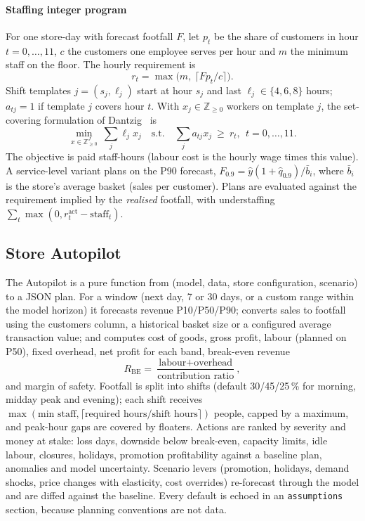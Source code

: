 \documentclass[conference]{IEEEtran}
\newcommand{\code}[1]{\texttt{\small #1}}
\begin{document}
\paragraph*{Staffing integer program} For one store-day with forecast footfall $F$, let $p_t$ be the
share of customers in hour $t=0,\dots,11$, $c$ the customers one employee serves per hour and $m$ the
minimum staff on the floor. The hourly requirement is
\begin{equation}
  r_t = \max\bigl(m,\ \lceil F p_t / c\rceil\bigr).
\end{equation}
Shift templates $j=(s_j,\ell_j)$ start at hour $s_j$ and last $\ell_j\in\{4,6,8\}$ hours; $a_{tj}=1$
if template $j$ covers hour $t$. With $x_j\in\mathbb{Z}_{\ge0}$ workers on template $j$, the
set-covering formulation of Dantzig~\cite{dantzig1954comment} is
\begin{equation}
  \min_{x\in\mathbb{Z}^{J}_{\ge 0}} \ \sum_j \ell_j x_j
  \quad\text{s.t.}\quad \sum_j a_{tj} x_j \ \ge\ r_t,\ \ t=0,\dots,11 .
\end{equation}
The objective is paid staff-hours (labour cost is the hourly wage times this value). A service-level
variant plans on the P90 forecast, $F_{0.9}=\hat y(1+\hat q_{0.9})/\bar b_i$, where $\bar b_i$ is the
store's average basket (sales per customer). Plans are evaluated against the requirement implied by
the \emph{realised} footfall, with understaffing $\sum_t \max(0, r^{\text{act}}_t - \text{staff}_t)$.

\subsection{Store Autopilot}\label{sec:autopilot}
The Autopilot is a pure function from (model, data, store configuration, scenario) to a JSON plan.
For a window (next day, 7 or 30 days, or a custom range within the model horizon) it forecasts
revenue P10/P50/P90; converts sales to footfall using the customers column, a historical basket size
or a configured average transaction value; and computes cost of goods, gross profit, labour (planned
on P50), fixed overhead, net profit for each band, break-even revenue
\begin{equation}
  R_{\text{BE}} = \frac{\text{labour} + \text{overhead}}{\text{contribution ratio}},
\end{equation}
and margin of safety. Footfall is split into shifts (default 30/45/25\,\% for morning, midday peak
and evening); each shift receives $\max(\text{min staff}, \lceil \text{required hours}/\text{shift
hours}\rceil)$ people, capped by a maximum, and peak-hour gaps are covered by floaters. Actions are
ranked by severity and money at stake: loss days, downside below break-even, capacity limits, idle
labour, closures, holidays, promotion profitability against a baseline plan, anomalies and model
uncertainty. Scenario levers (promotion, holidays, demand shocks, price changes with elasticity,
cost overrides) re-forecast through the model and are diffed against the baseline. Every default is
echoed in an \code{assumptions} section, because planning conventions are not data.
\end{document}
